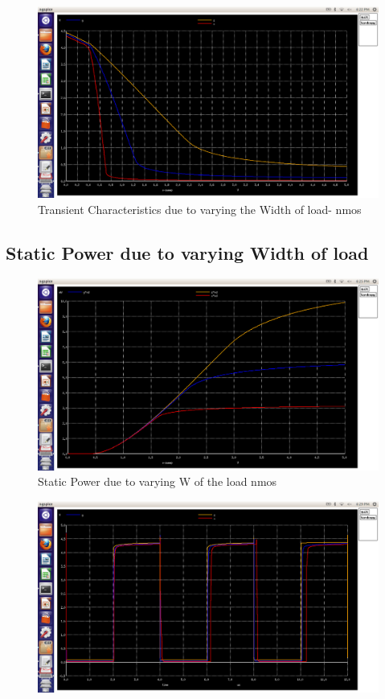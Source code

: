 \documentclass[12pt,a4paper]{article}
\begin{document}
\begin{center}
\begin{figure}[!ht]
\centering
\includegraphics[scale=0.37]{lab4_pic4_6_1_transfer_char_dueto_varing_Wof_loadnmos.png}

\caption[Short]{Transient Characteristics due to varying the Width of load- nmos}
\end{figure}

\subsection{Static Power due to varying Width of load}
\begin{figure}[!ht]
\centering
\includegraphics[scale=0.37]{lab4_pic4_6_2_static_power_dueto_varing_Wof_loadnmos.png}
\caption[Short]{Static Power due to varying W of the load nmos}
\end{figure}

\begin{figure}[!ht]
\centering
\includegraphics[scale=0.37]{lab4_pic4_6_5_transient_dueto_varing_Wof_loadnmos.png}


\end{figure}
\end{center}
\end{document}
